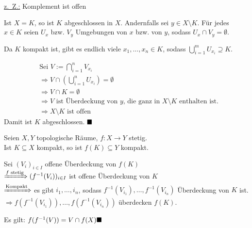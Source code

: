 \begin{beweis}
    \underline{z.~Z.:} Komplement ist offen

    Ist $X = K$, so ist $K$ abgeschlossen in $X$. Andernfalls sei 
    $y \in X \setminus K$. Für jedes $x \in K$ seien $U_x$ bzw. $V_y$
    Umgebungen von $x$ bzw. von $y$, sodass $U_x \cap V_y = \emptyset$.

    \begin{figure}[htp]
        \centering
        
    \end{figure}

    Da $K$ kompakt ist, gibt es endlich viele $x_1, \dots, x_n \in K$,
    sodass $\bigcup_{i=1}^m U_{x_i} \supseteq K$.

    \begin{align*}
        &\text{Sei } V := \bigcap_{i=1}^n V_{x_i}\\
        &\Rightarrow V \cap \left (\bigcup_{i=1}^n U_{x_i} \right) = \emptyset \\
        &\Rightarrow V \cap K = \emptyset\\
        &\Rightarrow V \text{ ist Überdeckung von } y\text{, die ganz in } X \setminus K \text{ enthalten ist}.\\
        &\Rightarrow X \setminus K \text{ ist offen}
    \end{align*}
    Damit ist $K$ abgeschlossen. $\qed$
\end{beweis}

\begin{bemerkung}\label{kor:5.6}%
    Seien $X, Y$ topologische Räume, $f: X \rightarrow Y$ stetig.\\
    Ist $K \subseteq X$ kompakt, so ist $f(K) \subseteq Y$ kompakt.
\end{bemerkung}

\begin{beweis}
    Sei $(V_i)_{i \in I}$ offene Überdeckung von $f(K)$\\
    $\xRightarrow{f \text{ stetig}} (f^{-1}(V_i))_{i \in I}$ ist offene Überdeckung von $K$\\
    $\xRightarrow{\text{Kompakt}}$ es gibt $i_1, \dots, i_n$, 
    sodass $f^{-1}(V_{i_1}), \dots, f^{-1}(V_{i_n})$ Überdeckung von
    $K$ ist.\\
    $\Rightarrow f(f^{-1}( V_{i_1})), \dots, f(f^{-1}(V_{i_n}))$ 
    überdecken $f(K)$.

    Es gilt: $f(f^{-1}(V)) = V \cap f(X) \qed$
\end{beweis}

